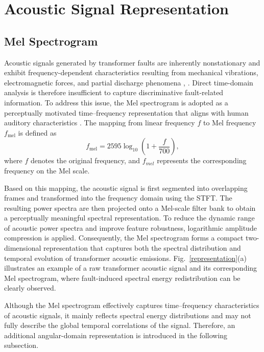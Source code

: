 \documentclass[journal]{IEEEtran}
\begin{document}
\section{Acoustic Signal Representation}
\label{section2}
\subsection{Mel Spectrogram}
Acoustic signals generated by transformer faults are inherently nonstationary and exhibit frequency-dependent characteristics resulting from mechanical vibrations, electromagnetic forces, and partial discharge phenomena \cite{2025110731}, \cite{215108965}. Direct time-domain analysis is therefore insufficient to capture discriminative fault-related information. To address this issue, the Mel spectrogram is adopted as a perceptually motivated time--frequency representation that aligns with human auditory characteristics \cite{10091539}. The mapping from linear frequency $f$ to Mel frequency $f_{\mathrm{mel}}$ is defined as
\begin{equation}
f_{\mathrm{mel}} = 2595 \log_{10}\left(1 + \frac{f}{700}\right),
\end{equation}
where \( f \) denotes the original frequency, and \(f_{mel}\) represents the corresponding frequency on the Mel scale. 

Based on this mapping, the acoustic signal is first segmented into overlapping frames and transformed into the frequency domain using the STFT. The resulting power spectra are then projected onto a Mel-scale filter bank to obtain a perceptually meaningful spectral representation. To reduce the dynamic range of acoustic power spectra and improve feature robustness, logarithmic amplitude compression is applied. Consequently, the Mel spectrogram forms a compact two-dimensional representation that captures both the spectral distribution and temporal evolution of transformer acoustic emissions. Fig.~\ref{representation}(a) illustrates an example of a raw transformer acoustic signal and its corresponding Mel spectrogram, where fault-induced spectral energy redistribution can be clearly observed.

Although the Mel spectrogram effectively captures time–frequency characteristics of acoustic signals, it mainly reflects spectral energy distributions and may not fully describe the global temporal correlations of the signal. Therefore, an additional angular-domain representation is introduced in the following subsection.
\end{document}
